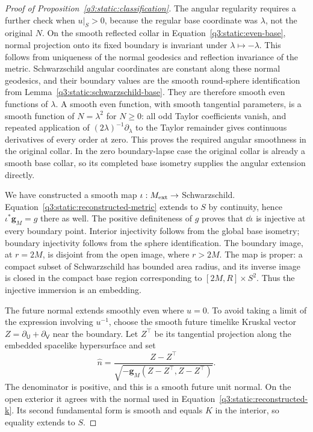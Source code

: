\begin{proof}[Proof of Proposition~\ref{q3:static:classification}]
The angular regularity requires a further check when
\(u|_S>0\), because the regular base coordinate was \(\lambda\),
not the original \(N\).
On the smooth reflected collar in
Equation~\eqref{q3:static:even-base}, normal projection onto its fixed
boundary is invariant under \(\lambda\mapsto-\lambda\).
This follows from uniqueness of the normal geodesics and reflection
invariance of the metric.
Schwarzschild angular coordinates are constant along these normal
geodesics, and their boundary values are the smooth round-sphere
identification from Lemma~\ref{q3:static:schwarzschild-base}.
They are therefore smooth even functions of \(\lambda\).
A smooth even function, with smooth tangential parameters, is a
smooth function of \(N=\lambda^2\) for \(N\geq0\):
all odd Taylor coefficients vanish, and repeated application of
\((2\lambda)^{-1}\partial_\lambda\) to the Taylor remainder gives
continuous derivatives of every order at zero.
This proves the required angular smoothness in the original collar.
In the zero boundary-lapse case the original collar is already a
smooth base collar, so its completed base isometry supplies the
angular extension directly.

We have constructed a smooth map \(\iota:M_{\mathrm{ext}}\to\) Schwarzschild.
Equation~\eqref{q3:static:reconstructed-metric} extends to \(S\)
by continuity, hence \(\iota^*\mathbf g_M=g\) there as well.
The positive definiteness of \(g\) proves that \(\dd\iota\) is
injective at every boundary point.
Interior injectivity follows from the global base isometry;
boundary injectivity follows from the sphere identification.
The boundary image, at \(r=2M\), is disjoint from the open image,
where \(r>2M\).
The map is proper: a compact subset of Schwarzschild has bounded
area radius, and its inverse image is closed in the compact base
region corresponding to
\([2M,R]\times S^2\).
Thus the injective immersion is an embedding.

The future normal extends smoothly even where \(u=0\).
To avoid taking a limit of the expression involving \(u^{-1}\),
choose the smooth future timelike Kruskal vector
\(Z=\partial_{\mathsf U}+\partial_{\mathsf V}\) near the boundary.
Let \(Z^\top\) be its tangential projection along the embedded
spacelike hypersurface and set
\[
\widehat n=
\frac{Z-Z^\top}
{\sqrt{-\mathbf g_M(Z-Z^\top,Z-Z^\top)}}.
\]
The denominator is positive, and this is a smooth future unit
normal. On the open exterior it agrees with the normal used in
Equation~\eqref{q3:static:reconstructed-k}.
Its second fundamental form is smooth and equals \(K\) in the
interior, so equality extends to \(S\).


\end{proof}
